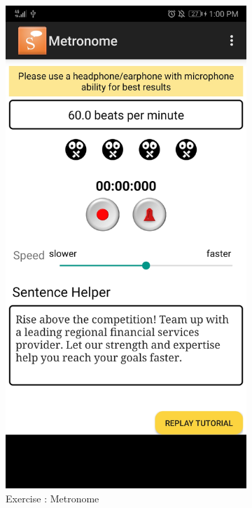 \begin{appendices}
\begin{landscape}
\begin{figure}[h]
\begin{subfigure}{.25\textwidth}
    \includegraphics[width=.75\linewidth]{content/imgs/old_app_3.jpg}
    \caption{Exercise : Metronome}
  \end{subfigure}%
  \begin{subfigure}{.25\textwidth}
    \centering

\end{subfigure}
\end{figure}
\end{landscape}
\end{appendices}
